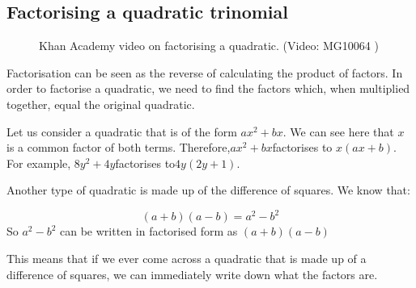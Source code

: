            \subsection* { Factorising a quadratic trinomial }
            \nopagebreak
      \label{m39394*eip-218}
    \setcounter{subfigure}{0}
	\begin{figure}[H] %
    \textnormal{Khan Academy video on factorising a quadratic.}\vspace{.1in} \nopagebreak
  \label{m39394*yt-media2}\label{m39394*yt-video2}
             { (Video:  MG10064 )}
      \vspace{2pt}
    \vspace{.1in}
 \end{figure}       \par \label{m39394*eip-411}Factorisation can be seen as the reverse of calculating the product of factors. In order to factorise a quadratic, we need to find the factors which, when multiplied together, equal the original quadratic.\par 

      \label{m39394*id275057}Let us consider a quadratic that is of the form $a{x}^{2}+bx$\hspace{1ex}. We can see here that $x$ is a common factor of both terms. Therefore,\hspace{1ex}$a{x}^{2}+bx$\hspace{1ex}factorises to $x\left(ax+b\right)$. For example, $8{y}^{2}+4y$\hspace{1ex}factorises to\hspace{1ex}$4y\left(2y+1\right)$.\par 
      \label{m39394*id275188}Another type of quadratic is made up of the difference of squares. We know that:\par 
      \label{m39394*id275192}\nopagebreak\noindent{}
        
    \begin{equation*}
    \left(a+b\right)\left(a-b\right)={a}^{2}-{b}^{2}
      \end{equation*}
So $a^2-b^2$ can be written in factorised form as $(a+b)(a-b)$
   
      \par 
This means that if we ever come across a quadratic that is made up of a difference of squares, we can immediately write down what the factors are.\par 
\label{m39394*secfhsst!!!underscore!!!id2008}\vspace{.5cm} 
      \noindent


